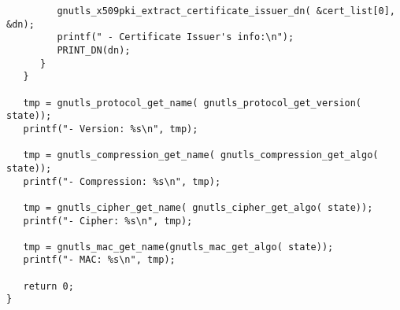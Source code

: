 \begin{verbatim}
         gnutls_x509pki_extract_certificate_issuer_dn( &cert_list[0], &dn);
         printf(" - Certificate Issuer's info:\n");
         PRINT_DN(dn);
      }
   }

   tmp = gnutls_protocol_get_name( gnutls_protocol_get_version( state));
   printf("- Version: %s\n", tmp);

   tmp = gnutls_compression_get_name( gnutls_compression_get_algo( state));
   printf("- Compression: %s\n", tmp);

   tmp = gnutls_cipher_get_name( gnutls_cipher_get_algo( state));
   printf("- Cipher: %s\n", tmp);

   tmp = gnutls_mac_get_name(gnutls_mac_get_algo( state));
   printf("- MAC: %s\n", tmp);

   return 0;
}

\end{verbatim}
